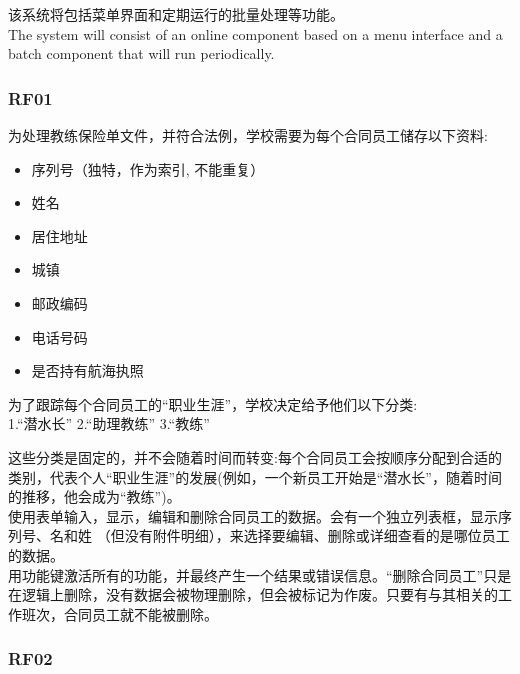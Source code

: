 该系统将包括菜单界面和定期运行的批量处理等功能。\\
The system will consist of an online component based on a menu interface and a batch component that will run periodically. \\

\hypertarget{ux63a5ux4e58ux5ba2}{%
\subsubsection{RF01}\label{ux63a5ux4e58ux5ba2}}

为处理教练保险单文件，并符合法例，学校需要为每个合同员工储存以下资料: \\


\begin{itemize}
\tightlist
\item
  序列号（独特，作为索引, 不能重复）
\item
  姓名
\item
  居住地址
\item
  城镇
\item
  邮政编码
\item
  电话号码
\item
  是否持有航海执照
\end{itemize}

为了跟踪每个合同员工的“职业生涯”，学校决定给予他们以下分类: \\
1.“潜水长”
2.“助理教练”
3.“教练”

这些分类是固定的，并不会随着时间而转变:每个合同员工会按顺序分配到合适的类别，代表个人“职业生涯”的发展(例如，一个新员工开始是“潜水长”，随着时间的推移，他会成为“教练”)。\\

使用表单输入，显示，编辑和删除合同员工的数据。会有一个独立列表框，显示序列号、名和姓 （但没有附件明细），来选择要编辑、删除或详细查看的是哪位员工的数据。\\


用功能键激活所有的功能，并最终产生一个结果或错误信息。“删除合同员工”只是在逻辑上删除，没有数据会被物理删除，但会被标记为作废。只要有与其相关的工作班次，合同员工就不能被删除。 \\

\hypertarget{ux63a5ux4e58ux5ba2}{%
\subsubsection{RF02}\label{ux63a5ux4e58ux5ba2}}


